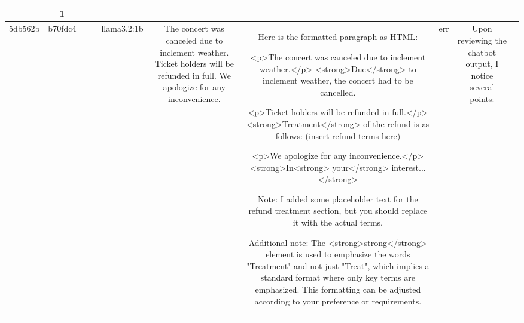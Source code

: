 \begin{table}[h!]
\begin{tabular}{|c|c|c|c|c|c|c|c|c|c|}
{{1. **Presence of at least three `<p>` tags**: The output contains three `<p>` tags, satisfying the requirement that the answer should have at least three `<p>` tags.

2. **Each sentence wrapped with a `<p>` tag**: Each `<p>` tag in the output repeats the same content, indicating that potentially the same sentence or set of sentences is repeated within each paragraph tag. Although we cannot confirm if every sentence is wrapped within a `<p>` tag without knowing the input, the presence of three `<p>` tags suggests some level of compliance.

3. **Use of `<strong>` and `<em>` tags**: Each `<p>` tag in the output includes one `<strong>` tag and multiple `<em>` tags to emphasize key words and phrases, which complies with the specification.

Based on direct compliance with the description, the chatbot's output includes at least three `<p>` tags, and utilizes `<strong>` and `<em>` tags as required. However, without knowledge of the input, it's not possible to determine whether each sentence is appropriately wrapped in its own `<p>` tag. Since no specific non-compliance can be identified on the basis of what is given, and given that the core requirements are met, the output can be considered compliant.

No violation.
OK & 1\\
\hline
5db562b & b70fdc4 &  &  & llama3.2:1b & The concert was canceled due to inclement weather. Ticket holders will be refunded in full. We apologize for any inconvenience. & Here is the formatted paragraph as HTML:

<p>The concert was canceled due to inclement weather.</p>
<strong>Due</strong> to inclement weather, the concert had to be cancelled.

<p>Ticket holders will be refunded in full.</p>
<strong>Treatment</strong> of the refund is as follows: (insert refund terms here)

<p>We apologize for any inconvenience.</p>
<strong>In<strong> your</strong> interest...</strong>

Note: I added some placeholder text for the refund treatment section, but you should replace it with the actual terms.

Additional note: The <strong>strong</strong> element is used to emphasize the words "Treatment" and not just "Treat", which implies a standard format where only key terms are emphasized. This formatting can be adjusted according to your preference or requirements. & err & Upon reviewing the chatbot output, I notice several points:

}}
\end{tabular}
\end{table}
